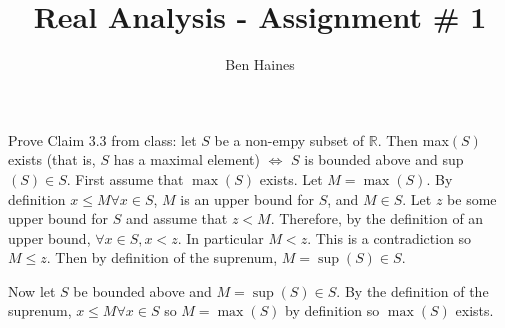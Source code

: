 \documentclass[paper=a4, fontsize=11pt]{jhwhw} %
\begin{document}
\title{Real Analysis - Assignment \# 1}
\author{Ben Haines}

Prove Claim 3.3 from class: let $S$ be a non-empy subset of $\mathbb R$. Then max$(S)$ exists (that is, $S$ has a maximal element) $\iff$ $S$ is bounded above and sup$(S)\in S$.
\solution
First assume that $\max(S)$ exists. Let $M = \max(S)$. By definition $x \le M \forall x\in S$, $M$ is an upper bound for $S$, and $M\in S$. Let $z$ be some upper bound for $S$ and assume that $z < M$. Therefore, by the definition of an upper bound, $\forall x \in S, x < z$. In particular $M < z$. This is a contradiction so $M \le z$. Then by definition of the suprenum, $M = \sup(S)\in S$. 

Now let $S$ be bounded above and $M = \sup(S)\in S$. By the definition of the suprenum, $x\le M \forall x\in S$ so $M = \max(S)$ by definition so $\max(S)$ exists.
\end{document}

